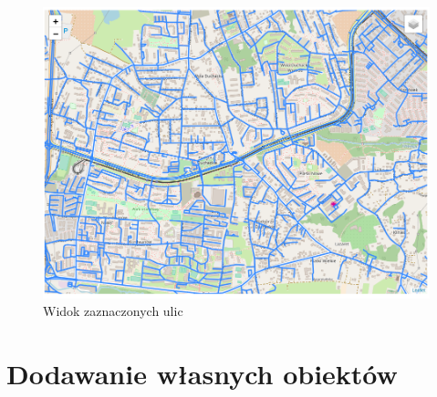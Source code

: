 \begin{figure}[h]
\caption{Widok zaznaczonych ulic}
\label{sec:onlyStreetMap}
\centering
\includegraphics[width=1.03\textwidth]{onlyStreet}
\end{figure}

\newpage
\section{Dodawanie własnych obiektów}
\label{sec:addedCustomObjects}